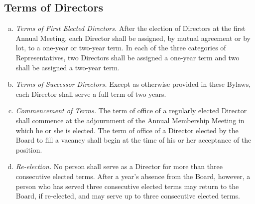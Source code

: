 \subsection{Terms of Directors}
\begin{enumerate}[a.]
\item \emph{Terms of First Elected Directors.}  After the election of
  Directors at the first Annual Meeting, each Director shall be
  assigned, by mutual agreement or by lot, to a one-year or two-year
  term. In each of the three categories of Representatives, two
  Directors shall be assigned a one-year term and two shall be
  assigned a two-year term.
\item \emph{Terms of Successor Directors.}  Except as otherwise
  provided in these Bylaws, each Director shall serve a full term of
  two years.
\item \emph{Commencement of Terms.}  The term of office of a regularly
  elected Director shall commence at the adjournment of the Annual
  Membership Meeting in which he or she is elected. The term of office
  of a Director elected by the Board to fill a vacancy shall begin at
  the time of his or her acceptance of the position.
\item \emph{Re-election.}  No person shall serve as a Director for
  more than three consecutive elected terms. After a year’s absence
  from the Board, however, a person who has served three consecutive
  elected terms may return to the Board, if re-elected, and may serve
  up to three consecutive elected terms.
\end{enumerate}
  

